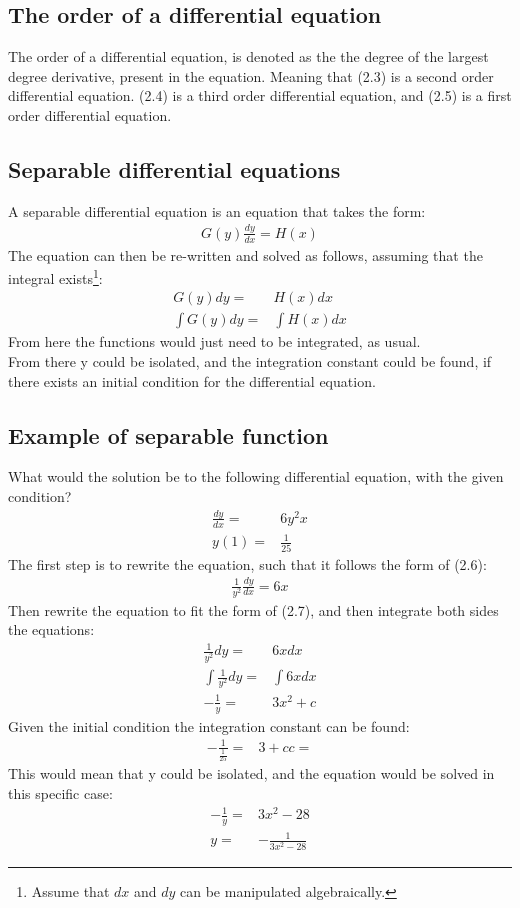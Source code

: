 \subsection{The order of a differential equation}
The order of a differential equation, is denoted as the the degree of the largest degree derivative, present in the equation. Meaning that (2.3) is a second order differential equation. (2.4) is a third order differential equation, and (2.5) is a first order differential equation.

\subsection{Separable differential equations}
A separable differential equation is an equation that takes the form:
\begin{align}
	G(y)\frac{dy}{dx}=H(x)
\end{align}
The equation can then be re-written and solved as follows, assuming that the integral exists\footnote{Assume that $dx$ and $dy$ can be manipulated algebraically. }:
\begin{align}
	G(y)dy=&H(x)dx				\\
	\int G(y)dy =& \int H(x)dx
\end{align}
From here the functions would just need to be integrated, as usual.\\
From there y could be isolated, and the integration constant could be found, if there exists an initial condition for the differential equation.
\subsection{Example of separable function}
What would the solution be to the following differential equation, with the given condition?
\begin{align*}
	\frac{dy}{dx} =& 6y^2x\\
	y(1)=&\frac{1}{25}
\end{align*}
The first step is to rewrite the equation, such that it follows the form of (2.6):
\begin{align*}
	\frac{1}{y^2}\frac{dy}{dx}=6x
\end{align*}
Then rewrite the equation to fit the form of (2.7), and then integrate both sides the equations:
\begin{align*}
	\frac{1}{y^2}dy=&6x dx				\\
	\int \frac{1}{y^2}dy=&\int 6x dx		\\
	-\frac{1}{y}=&3x^2+c		
\end{align*}
Given the initial condition the integration constant can be found:
\begin{align*}
	-\frac{1}{\frac{1}{25}}=&3+c
	c=%
\end{align*}
This would mean that y could be isolated, and the equation would be solved in this specific case:
\begin{align*}
	-\frac{1}{y}=&3x^2-28\\
	y=&-\frac{1}{3x^2-28}
\end{align*}